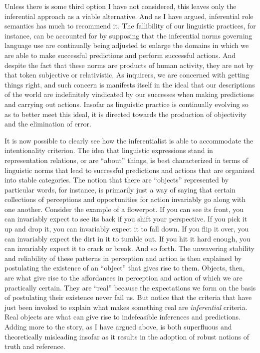 Unless there is some third option I have not considered, this leaves only the inferential approach as a viable alternative. And as I have argued, inferential role semantics has much to recommend it. The fallibility of our linguistic practices, for instance, can be accounted for by supposing that the inferential norms governing language use are continually being adjusted to enlarge the domains in which we are able to make successful predictions and perform successful actions. And despite the fact that these norms are products of human activity, they are not by that token subjective or relativistic. As inquirers, we are concerned with getting things right, and such concern is manifests itself in the ideal that our descriptions of the world are indefinitely vindicated by our successes when making predictions and carrying out actions. Insofar as linguistic practice is continually evolving so as to better meet this ideal, it is directed towards the production of objectivity and the elimination of error.

It is now possible to clearly see how the inferentialist is able to accommodate the intentionality criterion. The idea that linguistic expressions stand in representation relations, or are ``about'' things, is best characterized in terms of linguistic norms that lead to successful predictions and actions that are organized into stable categories. The notion that there are ``objects'' represented by particular words, for instance, is primarily just a way of saying that certain collections of perceptions and opportunities for action invariably go along with one another. Consider the example of a flowerpot. If you can see its front, you can invariably expect to see its back if you shift your perspective. If you pick it up and drop it, you can invariably expect it to fall down. If you flip it over, you can invariably expect the dirt in it to tumble out. If you hit it hard enough, you can invariably expect it to crack or break. And so forth. The unwavering stability and reliability of these patterns in perception and action is then explained by postulating the existence of an ``object'' that gives rise to them. Objects, then, are what give rise to the affordances in perception and action of which we are practically certain. They are ``real'' because the expectations we form on the basis of postulating their existence never fail us. But notice that the criteria that have just been invoked to explain what makes something real are \textit{inferential} criteria. Real objects are what can give rise to indefeasible inferences and predictions. Adding more to the story, as I have argued above, is both superfluous and theoretically misleading insofar as it results in the adoption of robust notions of truth and reference. 

